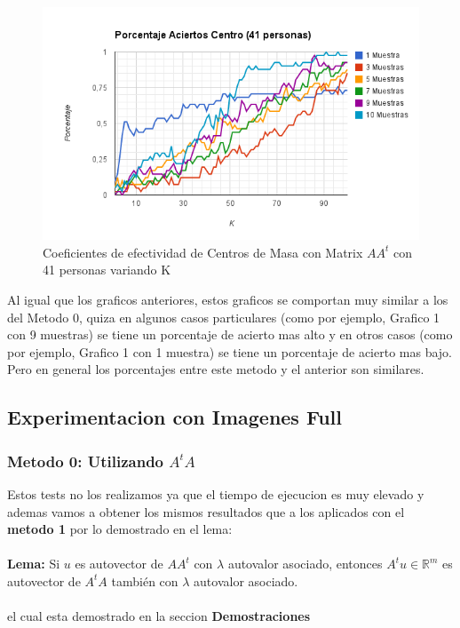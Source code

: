 \begin{figure}[H]
\includegraphics[width=1\textwidth]{img/imager.png}
     \caption{Coeficientes de efectividad de Centros de Masa con Matrix $AA^t$ con 41 personas variando K}
\end{figure}

Al igual que los graficos anteriores, estos graficos se comportan muy similar a los del Metodo 0, quiza en algunos casos particulares (como por ejemplo, Grafico 1 con 9 muestras) se tiene un porcentaje de acierto mas alto y en otros casos (como por ejemplo, Grafico 1 con 1 muestra) se tiene un porcentaje de acierto mas bajo. Pero en general los porcentajes entre este metodo y el anterior son similares.



\subsection{Experimentacion con Imagenes Full}

\subsubsection{Metodo 0: Utilizando $A^tA$}

Estos tests no los realizamos ya que el tiempo de ejecucion es muy elevado y ademas vamos  a obtener los mismos resultados que a los aplicados con el \textbf{metodo 1} por lo demostrado en el lema:
\\
\\
\textbf{Lema:} Si $u$ es autovector de $A A^t$ con $\lambda$ autovalor asociado, entonces $A^t u \in
\mathbb{R}^m$ es autovector de $A^t A$ también con $\lambda$ autovalor asociado.
\\
\\
 el cual esta demostrado en la seccion \textbf{Demostraciones}
 
